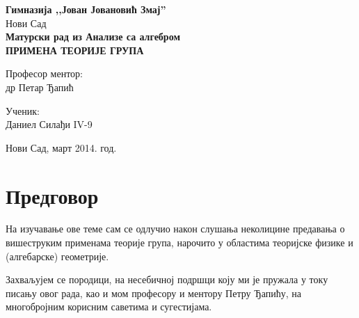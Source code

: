 \documentclass{report}
\theoremstyle{plain}
\theoremstyle{definition}
\begin{document}
\pagestyle{fancy}

\begin{titlepage}
\begin{center}
\Large\textbf{Гимназија ,,Јован Јовановић Змај''}\\
\Large Нови Сад\\[8.7cm]
\LARGE\bfseries Матурски рад из Анализе са алгебром\\[3mm]
\LARGE\bfseries ПРИМЕНА ТЕОРИЈЕ ГРУПА\\
\end{center}
\vfill
\begin{minipage}{0.5\textwidth}
\begin{flushleft}
\Large Професор ментор:\\
\Large др Петар Ђапић
\end{flushleft}
\end{minipage}
\begin{minipage}{0.5\textwidth}
\begin{flushright}
\Large Ученик:\\
\Large Даниел Силађи IV-9
\end{flushright}
\end{minipage}
\vspace{0.5mm}
\begin{center}
\Large Нови Сад, март 2014. год.
\end{center}
\end{titlepage}

\chapter*{Предговор}

На изучавање ове теме сам се одлучио након слушања неколицине предавања о вишеструким применама теорије група, нарочито у областима теоријске физике и (алгебарске) геометрије.

Захваљујем се породици, на несебичној подршци коју ми је пружала у току писању овог рада, као и мом професору и ментору Петру Ђапићу, на многобројним корисним саветима и сугестијама.

\setcounter{tocdepth}{1}
\tableofcontents
\end{document}
